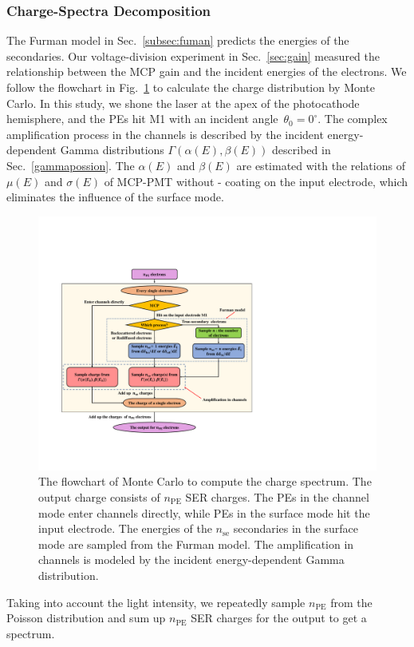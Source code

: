 \subsubsection{Charge-Spectra Decomposition}\label{sec:convolution}
The Furman model in Sec.~\ref{subsec:fuman} predicts the energies of the secondaries.
Our voltage-division experiment in Sec.~\ref{sec:gain} measured the relationship between the
MCP gain and the incident energies of the electrons.
We follow the flowchart in Fig.~\ref{fig:process} to calculate the charge distribution by Monte Carlo.
In this study, we shone the laser at the apex of the photocathode hemisphere,
and the PEs hit M1 with an incident angle~$\theta_0=0^\circ$.
The complex amplification process in the channels is described by
the incident energy-dependent Gamma distributions $\varGamma(\alpha(E), \beta(E))$ described in Sec.~\ref{gammapossion}. The $\alpha(E)$ and $\beta(E)$ are estimated with the relations of $\mu(E)$ and $\sigma(E)$ of MCP-PMT without - coating on the input electrode, which eliminates the influence of the surface mode.
\begin{figure}[!ht]
	\centering
	\includegraphics[width=\linewidth]{PMTRelated/GTmodel/process.pdf}
	\caption{The flowchart of Monte Carlo to compute the charge spectrum.
		The output charge consists of $n_\mathrm{PE}$ SER charges.
		The PEs in the channel mode enter channels directly, while PEs in the surface mode hit the input electrode.
		The energies of the $n_\mathrm{se}$ secondaries in the surface mode are sampled from the Furman model.
		The amplification in channels is modeled by the incident energy-dependent Gamma distribution.
	}
	\label{fig:process}
\end{figure}
Taking into account the light intensity, we repeatedly sample $n_{\mathrm{PE}}$ from the Poisson distribution
and sum up $n_{\mathrm{PE}}$ SER charges for the output to get a spectrum.

